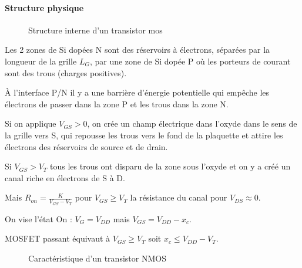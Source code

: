 \documentclass[main.tex]{subfiles}
\begin{document}

\paragraph{Structure physique}

\begin{figure}[H]
  \centering

  \caption{Structure interne d'un transistor mos}
\end{figure}


Les 2 zones de Si dopées N sont des réservoirs à électrons, séparées par la longueur de la grille $L_G$, par une zone de Si dopée P où les porteurs de courant sont des trous (charges positives).

À l'interface P/N il y a une barrière d'énergie potentielle qui empêche les électrons de passer dans la zone P et les trous dans la zone N.

Si on applique $V_{GS}>0$, on crée un champ électrique dans l'oxyde dans le sens de la grille vers S, qui repousse les trous vers le fond de la plaquette et attire les électrons des réservoirs de source et de drain.

Si $V_{GS}>V_T$ tous les trous ont disparu de la zone sous l'oxyde et on y a créé un canal riche en électrons de S à D.


Mais $R_{on} = \frac{K}{V_{GS}-V_T}$ pour $V_{GS} \geq V_T$ la résistance du canal pour $V_{DS} \approx 0$.

On vise l'état On : $V_G = V_{DD}$ mais $V_{GS}=V_{DD}-x_c$.

MOSFET passant équivaut à $V_{GS} \geq V_T$ soit $x_c \leq V_{DD}-V_T$.

\begin{figure}[H]
  \centering
  \caption{Caractéristique d'un transistor NMOS}
\end{figure}
\end{document}
